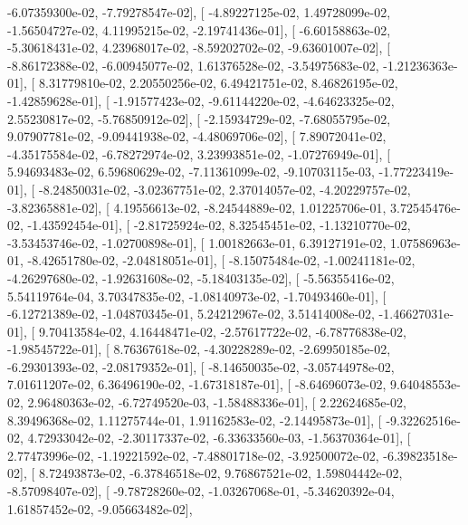 \documentclass{article}
\begin{document}
         -6.07359300e-02,  -7.79278547e-02],
       [ -4.89227125e-02,   1.49728099e-02,  -1.56504727e-02,
          4.11995215e-02,  -2.19741436e-01],
       [ -6.60158863e-02,  -5.30618431e-02,   4.23968017e-02,
         -8.59202702e-02,  -9.63601007e-02],
       [ -8.86172388e-02,  -6.00945077e-02,   1.61376528e-02,
         -3.54975683e-02,  -1.21236363e-01],
       [  8.31779810e-02,   2.20550256e-02,   6.49421751e-02,
          8.46826195e-02,  -1.42859628e-01],
       [ -1.91577423e-02,  -9.61144220e-02,  -4.64623325e-02,
          2.55230817e-02,  -5.76850912e-02],
       [ -2.15934729e-02,  -7.68055795e-02,   9.07907781e-02,
         -9.09441938e-02,  -4.48069706e-02],
       [  7.89072041e-02,  -4.35175584e-02,  -6.78272974e-02,
          3.23993851e-02,  -1.07276949e-01],
       [  5.94693483e-02,   6.59680629e-02,  -7.11361099e-02,
         -9.10703115e-03,  -1.77223419e-01],
       [ -8.24850031e-02,  -3.02367751e-02,   2.37014057e-02,
         -4.20229757e-02,  -3.82365881e-02],
       [  4.19556613e-02,  -8.24544889e-02,   1.01225706e-01,
          3.72545476e-02,  -1.43592454e-01],
       [ -2.81725924e-02,   8.32545451e-02,  -1.13210770e-02,
         -3.53453746e-02,  -1.02700898e-01],
       [  1.00182663e-01,   6.39127191e-02,   1.07586963e-01,
         -8.42651780e-02,  -2.04818051e-01],
       [ -8.15075484e-02,  -1.00241181e-02,  -4.26297680e-02,
         -1.92631608e-02,  -5.18403135e-02],
       [ -5.56355416e-02,   5.54119764e-04,   3.70347835e-02,
         -1.08140973e-02,  -1.70493460e-01],
       [ -6.12721389e-02,  -1.04870345e-01,   5.24212967e-02,
          3.51414008e-02,  -1.46627031e-01],
       [  9.70413584e-02,   4.16448471e-02,  -2.57617722e-02,
         -6.78776838e-02,  -1.98545722e-01],
       [  8.76367618e-02,  -4.30228289e-02,  -2.69950185e-02,
         -6.29301393e-02,  -2.08179352e-01],
       [ -8.14650035e-02,  -3.05744978e-02,   7.01611207e-02,
          6.36496190e-02,  -1.67318187e-01],
       [ -8.64696073e-02,   9.64048553e-02,   2.96480363e-02,
         -6.72749520e-03,  -1.58488336e-01],
       [  2.22624685e-02,   8.39496368e-02,   1.11275744e-01,
          1.91162583e-02,  -2.14495873e-01],
       [ -9.32262516e-02,   4.72933042e-02,  -2.30117337e-02,
         -6.33633560e-03,  -1.56370364e-01],
       [  2.77473996e-02,  -1.19221592e-02,  -7.48801718e-02,
         -3.92500072e-02,  -6.39823518e-02],
       [  8.72493873e-02,  -6.37846518e-02,   9.76867521e-02,
          1.59804442e-02,  -8.57098407e-02],
       [ -9.78728260e-02,  -1.03267068e-01,  -5.34620392e-04,
          1.61857452e-02,  -9.05663482e-02],
\end{document}
